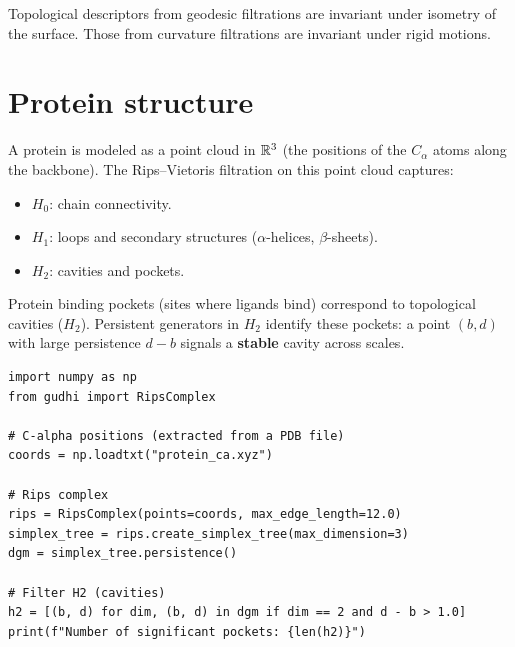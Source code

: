 \begin{proposition}[Invariance]
Topological descriptors from geodesic filtrations are invariant under
isometry of the surface. Those from curvature filtrations are
invariant under rigid motions.
\end{proposition}

\section{Protein structure}
\label{sec:proteins}

\begin{definition}
A protein is modeled as a point cloud in $\mathbb{R}^3$ (the positions of
the $C_\alpha$ atoms along the backbone). The Rips--Vietoris
filtration on this point cloud captures:
\begin{itemize}
  \item $H_0$: chain connectivity.
  \item $H_1$: loops and secondary structures ($\alpha$-helices,
        $\beta$-sheets).
  \item $H_2$: cavities and pockets.
\end{itemize}
\end{definition}

\begin{example}
Protein binding pockets (sites where ligands bind) correspond to
topological cavities ($H_2$). Persistent generators in $H_2$
identify these pockets: a point $(b, d)$ with large persistence
$d - b$ signals a \textbf{stable} cavity across scales.
\end{example}

\begin{verbatim}
import numpy as np
from gudhi import RipsComplex

# C-alpha positions (extracted from a PDB file)
coords = np.loadtxt("protein_ca.xyz")

# Rips complex
rips = RipsComplex(points=coords, max_edge_length=12.0)
simplex_tree = rips.create_simplex_tree(max_dimension=3)
dgm = simplex_tree.persistence()

# Filter H2 (cavities)
h2 = [(b, d) for dim, (b, d) in dgm if dim == 2 and d - b > 1.0]
print(f"Number of significant pockets: {len(h2)}")
\end{verbatim}


